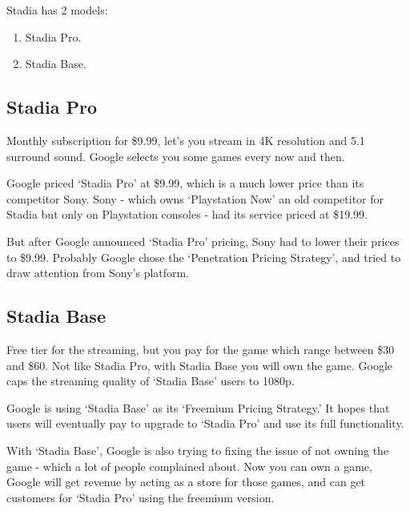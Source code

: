 Stadia has 2 models:
\begin{enumerate}
    \item Stadia Pro.
    \item Stadia Base.
\end{enumerate}

\subsection{Stadia Pro}
Monthly subscription for \$9.99, let's you stream in 4K resolution and 5.1 surround sound.
Google selects you some games every now and then. \cite{stadiaPro}

Google priced `Stadia Pro' at \$9.99, which is a much lower price than its competitor Sony.
Sony - which owns `Playstation Now' an old competitor for Stadia but only on Playstation consoles - had its service priced at \$19.99. \cite{sonyPrices}

But after Google announced `Stadia Pro' pricing, Sony had to lower their prices to \$9.99.
Probably Google chose the `Penetration Pricing Strategy', and tried to draw attention from Sony's platform. \cite{pricingStategy}

\subsection{Stadia Base}
Free tier for the streaming, but you pay for the game which range between \$30 and \$60.
Not like Stadia Pro, with Stadia Base you will own the game.
Google caps the streaming quality of `Stadia Base' users to 1080p. \cite{stadiaBase}

Google is using `Stadia Base' as its `Freemium Pricing Strategy.'
It hopes that users will eventually pay to upgrade to `Stadia Pro' and use its full functionality.

With `Stadia Base', Google is also trying to fixing the issue of not owning the game - which a lot of people complained about.
Now you can own a game, Google will get revenue by acting as a store for those games, and can get customers for `Stadia Pro' using the freemium version.